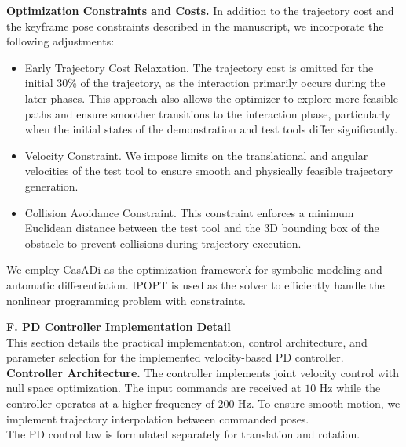 \noindent \textbf{Optimization Constraints and Costs.} In addition to the trajectory cost and the keyframe pose constraints described in the manuscript, we incorporate the following adjustments: 

\begin{itemize}
    \item Early Trajectory Cost Relaxation. The trajectory cost is omitted for the initial 30\% of the trajectory, as the interaction primarily occurs during the later phases. This approach also allows the optimizer to explore more feasible paths and ensure smoother transitions to the interaction phase, particularly when the initial states of the demonstration and test tools differ significantly.
    \item Velocity Constraint. We impose limits on the translational and angular velocities of the test tool to ensure smooth and physically feasible trajectory generation.
    \item Collision Avoidance Constraint. This constraint enforces a minimum Euclidean distance between the test tool and the 3D bounding box of the obstacle to prevent collisions during trajectory execution. 
\end{itemize}
\noindent We employ CasADi as the optimization framework for symbolic modeling and automatic differentiation. IPOPT is used as the solver to efficiently handle the nonlinear programming problem with constraints.
\newpage




\noindent \textbf{F. PD Controller Implementation Detail} \\
This section details the practical implementation, control architecture, and parameter selection for the implemented velocity-based PD controller.\\

\noindent \textbf{Controller Architecture.} The controller implements joint velocity control with null space optimization.
The input commands are received at $10\text{ Hz}$ while the controller operates at a higher frequency of $200\text{ Hz}$. To ensure smooth motion, we implement trajectory interpolation between commanded poses. \\

\noindent The PD control law is formulated separately for translation and rotation. 

